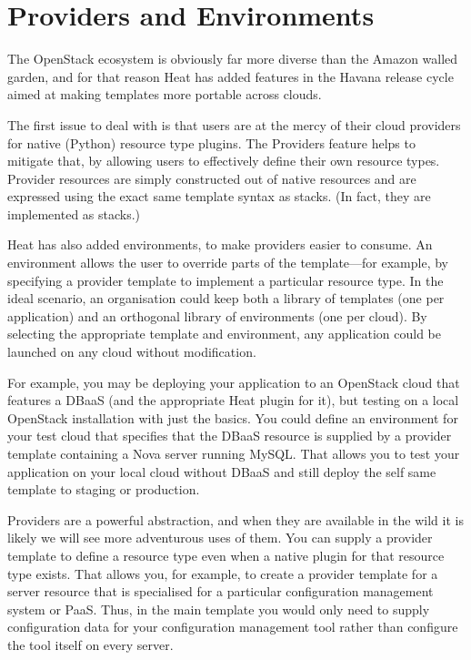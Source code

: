 \section{Providers and Environments}

The OpenStack ecosystem is obviously far more diverse than the Amazon walled garden, and for that reason Heat has added features in the Havana release cycle aimed at making templates more portable across clouds.

The first issue to deal with is that users are at the mercy of their cloud providers for native (Python) resource type plugins. The Providers feature helps to mitigate that, by allowing users to effectively define their own resource types. Provider resources are simply constructed out of native resources and are expressed using the exact same template syntax as stacks. (In fact, they are implemented as stacks.)

Heat has also added environments, to make providers easier to consume. An environment allows the user to override parts of the template---for example, by specifying a provider template to implement a particular resource type. In the ideal scenario, an organisation could keep both a library of templates (one per application) and an orthogonal library of environments (one per cloud). By selecting the appropriate template and environment, any application could be launched on any cloud without modification.

For example, you may be deploying your application to an OpenStack cloud that features a DBaaS (and the appropriate Heat plugin for it), but testing on a local OpenStack installation with just the basics. You could define an environment for your test cloud that specifies that the DBaaS resource is supplied by a provider template containing a Nova server running MySQL. That allows you to test your application on your local cloud without DBaaS and still deploy the self same template to staging or production.

Providers are a powerful abstraction, and when they are available in the wild it is likely we will see more adventurous uses of them. You can supply a provider template to define a resource type even when a native plugin for that resource type exists. That allows you, for example, to create a provider template for a server resource that is specialised for a particular configuration management system or PaaS. Thus, in the main template you would only need to supply configuration data for your configuration management tool rather than configure the tool itself on every server.
